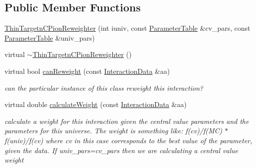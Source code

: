 \subsection*{Public Member Functions}
\begin{DoxyCompactItemize}
\item 
\hyperlink{class_neutrino_flux_reweight_1_1_thin_targetn_c_pion_reweighter_a6725a74d242b394bae9df83858d8bc9e}{Thin\-Targetn\-C\-Pion\-Reweighter} (int iuniv, const \hyperlink{class_neutrino_flux_reweight_1_1_parameter_table}{Parameter\-Table} \&cv\-\_\-pars, const \hyperlink{class_neutrino_flux_reweight_1_1_parameter_table}{Parameter\-Table} \&univ\-\_\-pars)
\item 
virtual \hyperlink{class_neutrino_flux_reweight_1_1_thin_targetn_c_pion_reweighter_aacffaaca361c640139134b33fca41ec7}{$\sim$\-Thin\-Targetn\-C\-Pion\-Reweighter} ()
\item 
virtual bool \hyperlink{class_neutrino_flux_reweight_1_1_thin_targetn_c_pion_reweighter_aaeb028c4bd75fcbbae6e03aba3a7e85a}{can\-Reweight} (const \hyperlink{class_neutrino_flux_reweight_1_1_interaction_data}{Interaction\-Data} \&aa)
\begin{DoxyCompactList}\small\item\em can the particular instance of this class reweight this interaction? \end{DoxyCompactList}\item 
virtual double \hyperlink{class_neutrino_flux_reweight_1_1_thin_targetn_c_pion_reweighter_abe918e387700a09d5878cfd22dddfdd8}{calculate\-Weight} (const \hyperlink{class_neutrino_flux_reweight_1_1_interaction_data}{Interaction\-Data} \&aa)
\begin{DoxyCompactList}\small\item\em calculate a weight for this interaction given the central value parameters and the parameters for this universe. The weight is something like\-: f(cv)/f(M\-C) $\ast$ f(univ)/f(cv) where cv in this case corresponds to the best value of the parameter, given the data. If univ\-\_\-pars=cv\-\_\-pars then we are calculating a central value weight \end{DoxyCompactList}\end{DoxyCompactItemize}
